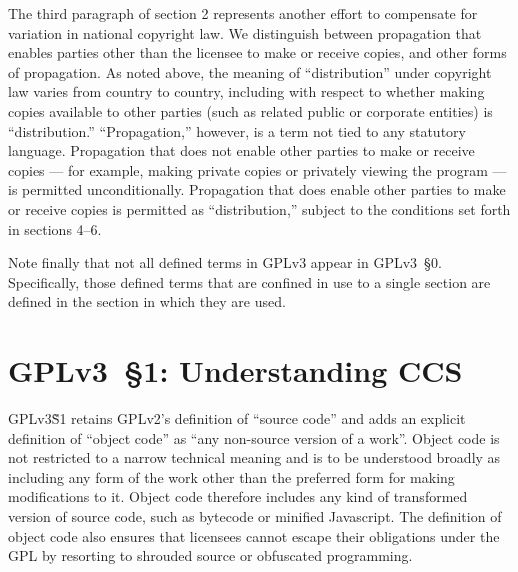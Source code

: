 
The third paragraph of section 2 represents another effort to compensate for
variation in national copyright law.  We distinguish between propagation that
enables parties other than the licensee to make or receive copies, and other
forms of propagation.  As noted above, the meaning of ``distribution'' under
copyright law varies from country to country, including with respect to
whether making copies available to other parties (such as related public or
corporate entities) is ``distribution.'' ``Propagation,'' however, is a term
not tied to any statutory language.  Propagation that does not enable other
parties to make or receive copies --- for example, making private copies or
privately viewing the program --- is permitted unconditionally.  Propagation
that does enable other parties to make or receive copies is permitted as
``distribution,'' subject to the conditions set forth in sections 4--6.


Note finally that not all defined terms in GPLv3 appear in GPLv3~\S0.
Specifically, those defined terms that are confined in use to a single
section are defined in the section in which they are used.

\section{GPLv3~\S1: Understanding CCS}



GPLv3\~S1 retains GPLv2's definition of ``source code'' and adds an explicit
definition of ``object code'' as ``any non-source version of a work''.
Object code is not restricted to a narrow technical meaning and is to be
understood broadly as including any form of the work other than the preferred
form for making modifications to it.  Object code therefore includes any kind
of transformed version of source code, such as bytecode or minified
Javascript.  The definition of object code also ensures that licensees cannot
escape their obligations under the GPL by resorting to shrouded source or
obfuscated programming.


